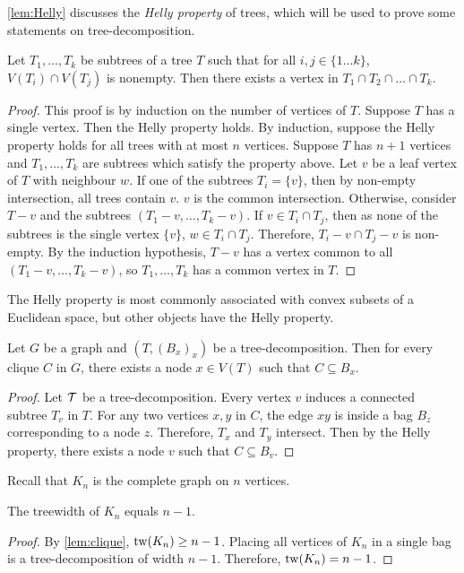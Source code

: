 \cref{lem:Helly} discusses the \textit{Helly property} of trees, which will be used to prove some statements on tree-decomposition. 

\begin{lemma}\label{lem:Helly}
	Let \(T_1, \ldots, T_k\) be subtrees of a tree \(T\) such that for all $i, j \in \{1 \ldots k\}$, $V(T_i) \cap V(T_j)$ is nonempty. Then there exists a vertex in $T_1 \cap T_2 \cap \ldots \cap T_k$.
\end{lemma}
\begin{proof}
	This proof is by induction on the number of vertices of $T$. Suppose $T$ has a single vertex. Then the Helly property holds. By induction, suppose the Helly property holds for all trees with at most $n$ vertices. Suppose $T$ has $n + 1$ vertices and \(T_1, \ldots, T_k\) are subtrees which satisfy the property above. Let $v$ be a leaf vertex of $T$ with neighbour $w$. If one of the subtrees $T_i = \{v\}$, then by non-empty intersection, all trees contain $v$. $v$ is the common intersection. Otherwise, consider $T - v$ and the subtrees $(T_1 - v, \ldots, T_k - v)$. If $v \in T_i \cap T_j$, then as none of the subtrees is the single vertex $\{v\}$, $w \in T_i \cap T_j$. Therefore, $T_i - v \cap T_j - v$ is non-empty. By the induction hypothesis, $T - v$ has a vertex common to all $(T_1 - v, \ldots, T_k - v)$, so \(T_1, \ldots, T_k\) has a common vertex in $T$. 
\end{proof}
The Helly property is most commonly associated with convex subsets of a Euclidean space, but other objects have the Helly property. 

\begin{proposition}\label{lem:clique}
	Let $G$ be a graph and $(T, (B_x)_{x})$ be a tree-decomposition. Then for every clique \(C\) in \(G\), there exists a node \(x \in V(T)\) such that \(C \subseteq B_x\).
\end{proposition}

\begin{proof}
	Let \(\mathcal{T}\) be a tree-decomposition. Every vertex \(v\) induces a connected subtree \(T_v\) in \(T\). For any two vertices \(x, y\) in \(C\), the edge \(xy\) is inside a bag \(B_z\) corresponding to a node \(z\). Therefore, \(T_x\) and \(T_y\) intersect. Then by the Helly property, there exists a node \(v\) such that \(C \subseteq B_v\).
\end{proof}

Recall that $K_n$ is the complete graph on $n$ vertices.

\begin{corollary}\label{cor:complete_tw}
	The treewidth of $K_n$ equals $n-1$. 
\end{corollary}
\begin{proof}
	By \cref{lem:clique}, $\operatorname{tw}(K_n)\geq n-1$. Placing all vertices of $K_n$ in a single bag is a tree-decomposition of width $n-1$. Therefore, $\operatorname{tw}(K_n) = n-1$. 
\end{proof}

